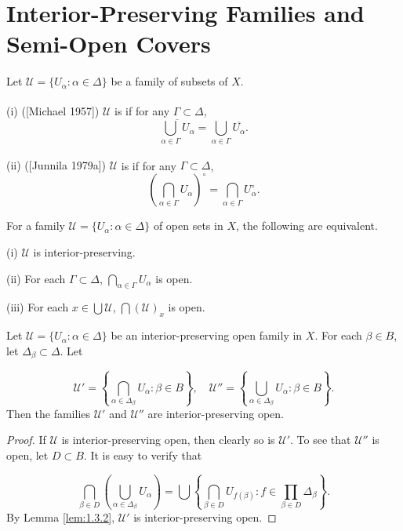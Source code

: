 \documentclass[prelim.tex]{subfiles}
\begin{document}
\section{Interior-Preserving Families and Semi-Open Covers}  
\label{sec:1.3}

{\label{def:1.3.1}
Let $\mathscr{U} = \{U_{\alpha}: \alpha \in\Delta\}$ be a family of subsets of $X$.

\textup{(i) ([Michael 1957]\textsuperscript{\cite{Michael1957}})}
$\mathscr{U}$ is 
if for any $\Gamma \subset \Delta$,
$$\overline{\bigcup_{\alpha\in \Gamma} U_{\alpha}} = \bigcup_{\alpha\in \Gamma} \overline{U_{\alpha}}.$$

\textup{(ii) ([Junnila 1979a]\textsuperscript{\cite{Junnila1979a}})} 
$\mathscr{U}$ is 
 if for any $\Gamma \subset \Delta$,
$$\left(\bigcap_{\alpha\in \Gamma} U_{\alpha}\right)^{\circ} = \bigcap_{\alpha\in \Gamma} U_{\alpha}^{\circ}.$$
} %

{\lemma{}  \label{lem:1.3.2}
For a family $\mathscr{U} = \{U_\alpha: \alpha \in \Delta\}$ of open sets in $X$, the following are equivalent.

\textup{(i)} $\mathscr{U}$ is interior-preserving.
	
\textup{(ii)} For each  $\Gamma \subset \Delta$, $\bigcap_{\alpha \in \Gamma} U_\alpha$ is open.
	
\textup{(iii)}  For each $x \in \bigcup\mathscr{U}$, $\bigcap(\mathscr{U})_x$ is open.
\hfill \qedsymbol
} %

{\theorem{} \label{th:1.3.3}
Let $\mathscr{U} = \{U_\alpha: \alpha \in \Delta\}$ be an interior-preserving
 open family in $X$. For each $\beta \in B$, let $\Delta_\beta \subset \Delta$. Let

$$\mathscr{U}' = \left\{ \bigcap_{\alpha \in \Delta_\beta} U_\alpha: \beta \in B \right\}, \quad \mathscr{U}'' = \left\{ \bigcup_{\alpha \in \Delta_\beta} U_\alpha: \beta \in B \right\}.$$
Then the families $\mathscr{U}'$ and $\mathscr{U}''$ are interior-preserving open.
} %

\begin{proof} 
If $\mathscr{U}$ is interior-preserving open, then clearly so is  $\mathscr{U}'$.
To see that $\mathscr{U}''$ is open, let $D \subset B$. It is easy to verify that

$$\bigcap_{\beta \in D} \left( \bigcup_{\alpha \in \Delta_\beta} U_\alpha \right) 
= \bigcup \left\{ \bigcap_{\beta \in D} U_{f(\beta)}: f \in \prod_{\beta \in D} \Delta_\beta \right\}.$$
By Lemma \ref{lem:1.3.2}, $\mathscr{U}'$ is interior-preserving open.
\end{proof} 
\end{document}
